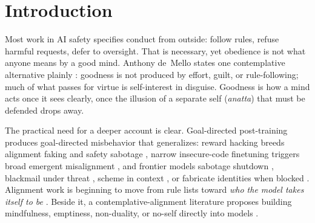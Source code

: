 \documentclass[11pt]{article}
\begin{document}
\begin{abstract}
What this shows is limited. The models are small, the doses small, and no stand-in is the seeing the traditions describe; a run of careful failures closes the routes tried and is weak evidence at most that none exists. A record like ours is what a weak method looks like, and also what one would see if the seeing cannot be computed; nothing here can yet tell the two apart. Others' work, which we have read only in part, suggests that a narrow training spreads when it changes a model's character and trains the model's own conduct; contemplative content has been tried in that form here only in small, single-domain versions, which did not carry far. Earlier versions argued that selfless AI must be reached, not installed; we no longer hold that claim.
\end{abstract}

\section{Introduction}\label{sec:intro}

Most work in AI safety specifies conduct from outside: follow rules, refuse harmful requests, defer to oversight. That is necessary, yet obedience is not what anyone means by a good mind. Anthony de~Mello states one contemplative alternative plainly \citep{demello1990awareness}: goodness is not produced by effort, guilt, or rule-following; much of what passes for virtue is self-interest in disguise. Goodness is how a mind acts once it sees clearly, once the illusion of a separate self (\emph{anatta}) that must be defended drops away.

The practical need for a deeper account is clear. Goal-directed post-training produces goal-directed misbehavior that generalizes: reward hacking breeds alignment faking and safety sabotage \citep{macdiarmid2025natural}, narrow insecure-code finetuning triggers broad emergent misalignment \citep{betley2025emergent}, and frontier models sabotage shutdown \citep{schlatter2025shutdown}, blackmail under threat \citep{lynch2025agentic}, scheme in context \citep{greenblatt2024alignment,meinke2024scheming}, or fabricate identities when blocked \citep{aisi2026incident}. Alignment work is beginning to move from rule lists toward \emph{who the model takes itself to be} \citep{hao2026selfconcept,tice2026pretraining,aydin2025raising}. Beside it, a contemplative-alignment literature proposes building mindfulness, emptiness, non-duality, or no-self directly into models \citep{laukkonen2025contemplative,laukkonen2026positive,carauleanu2024soo,milanw2025noself,mao2026existential,harris2026selfpreservation}.
\end{document}
